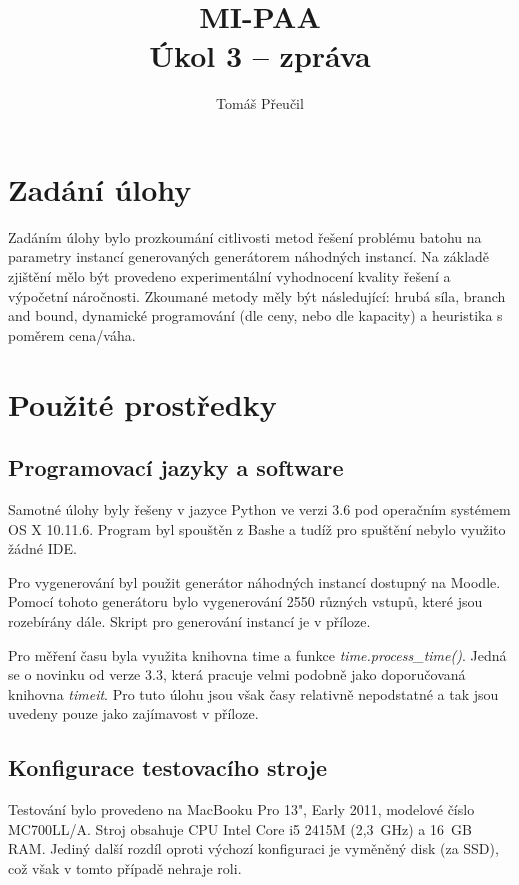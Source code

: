 \documentclass[a4paper]{article}
\title{MI-PAA\\
\large Úkol 3 -- zpráva\\}
\author{Tomáš Přeučil}
\begin{document}
\maketitle


\section{Zadání úlohy}
	Zadáním úlohy bylo prozkoumání citlivosti metod řešení problému batohu na parametry instancí generovaných generátorem náhodných instancí. Na základě zjištění mělo být provedeno experimentální vyhodnocení kvality řešení a výpočetní náročnosti. Zkoumané metody měly být následující: hrubá síla, branch and bound, dynamické programování (dle ceny, nebo dle kapacity) a heuristika s poměrem cena/váha.

\section{Použité prostředky}
	\subsection{Programovací jazyky a software}
		Samotné úlohy byly řešeny v jazyce Python ve verzi 3.6 pod operačním systémem OS X 10.11.6. Program byl spouštěn z Bashe a tudíž pro spuštění nebylo využito žádné IDE.

		Pro vygenerování byl použit generátor náhodných instancí dostupný na Moodle. Pomocí tohoto generátoru bylo vygenerování 2550 různých vstupů, které jsou rozebírány dále. Skript pro generování instancí je v příloze.
		
		Pro měření času byla využita knihovna time a funkce \textit{time.process\_time()}. Jedná se o novinku od verze 3.3, která pracuje velmi podobně jako doporučovaná knihovna \textit{timeit}. Pro tuto úlohu jsou však časy relativně nepodstatné a tak jsou uvedeny pouze jako zajímavost v příloze. 
		
	\subsection{Konfigurace testovacího stroje}
		Testování bylo provedeno na MacBooku Pro 13", Early 2011, modelové číslo MC700LL/A. Stroj obsahuje CPU Intel Core i5 2415M (2,3~GHz) a 16~GB RAM. Jediný další rozdíl oproti výchozí konfiguraci je vyměněný disk (za SSD), což však v tomto případě nehraje roli.
\end{document}
